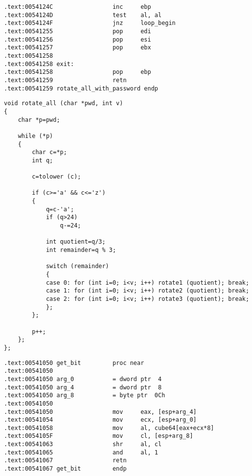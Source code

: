 
\begin{lstlisting}
.text:0054124C                 inc     ebp
.text:0054124D                 test    al, al
.text:0054124F                 jnz     loop_begin
.text:00541255                 pop     edi
.text:00541256                 pop     esi
.text:00541257                 pop     ebx
.text:00541258
.text:00541258 exit:
.text:00541258                 pop     ebp
.text:00541259                 retn
.text:00541259 rotate_all_with_password endp
\end{lstlisting}


\begin{lstlisting}
void rotate_all (char *pwd, int v)
{
	char *p=pwd;

	while (*p)
	{
		char c=*p;
		int q;

		c=tolower (c);

		if (c>='a' && c<='z')
		{
			q=c-'a';
			if (q>24)
				q-=24;

			int quotient=q/3;
			int remainder=q % 3;

			switch (remainder)
			{
			case 0: for (int i=0; i<v; i++) rotate1 (quotient); break;
			case 1: for (int i=0; i<v; i++) rotate2 (quotient); break;
			case 2: for (int i=0; i<v; i++) rotate3 (quotient); break;
			};
		};

		p++;
	};
};
\end{lstlisting}



\begin{lstlisting}
.text:00541050 get_bit         proc near
.text:00541050
.text:00541050 arg_0           = dword ptr  4
.text:00541050 arg_4           = dword ptr  8
.text:00541050 arg_8           = byte ptr  0Ch
.text:00541050
.text:00541050                 mov     eax, [esp+arg_4]
.text:00541054                 mov     ecx, [esp+arg_0]
.text:00541058                 mov     al, cube64[eax+ecx*8]
.text:0054105F                 mov     cl, [esp+arg_8]
.text:00541063                 shr     al, cl
.text:00541065                 and     al, 1
.text:00541067                 retn
.text:00541067 get_bit         endp
\end{lstlisting}


